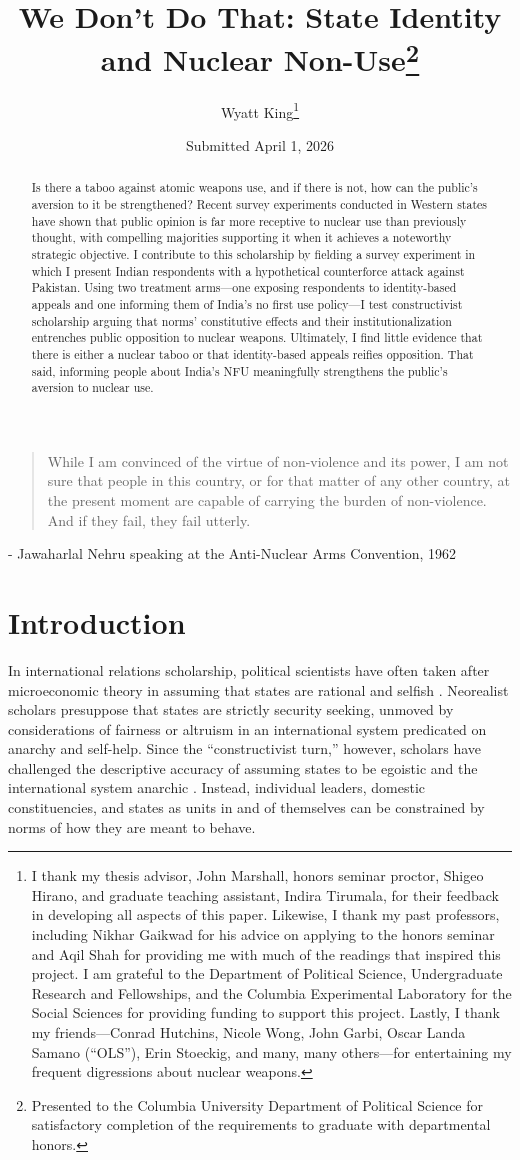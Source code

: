 \documentclass[12pt]{article}
\title{We Don't Do That: State Identity and Nuclear Non-Use\footnote{Presented to the Columbia University Department of Political Science for satisfactory completion of the requirements to graduate with departmental honors.}}
\author{Wyatt King\footnote{I thank my thesis advisor, John Marshall, honors seminar proctor, Shigeo Hirano, and graduate teaching assistant, Indira Tirumala, for their feedback in developing all aspects of this paper. Likewise, I thank my past professors, including Nikhar Gaikwad for his advice on applying to the honors seminar and Aqil Shah for providing me with much of the readings that inspired this project. I am grateful to the Department of Political Science, Undergraduate Research and Fellowships, and the Columbia Experimental Laboratory for the Social Sciences for providing funding to support this project. Lastly, I thank my friends—Conrad Hutchins, Nicole Wong, John Garbi, Oscar Landa Samano (“OLS”), Erin Stoeckig, and many, many others—for entertaining my frequent digressions about nuclear weapons.}}
\date{Submitted April 1, 2026}
\begin{document}
\maketitle
\begin{abstract} 
Is there a taboo against atomic weapons use, and if there is not, how can the public's aversion to it be strengthened? Recent survey experiments conducted in Western states have shown that public opinion is far more receptive to nuclear use than previously thought, with compelling majorities supporting it when it achieves a noteworthy strategic objective. I contribute to this scholarship by fielding a survey experiment in which I present Indian respondents with a hypothetical counterforce attack against Pakistan. Using two treatment arms—one exposing respondents to identity-based appeals and one informing them of India's no first use policy—I test constructivist scholarship arguing that norms' constitutive effects and their institutionalization entrenches public opposition to nuclear weapons. Ultimately, I find little evidence that there is either a nuclear taboo or that identity-based appeals reifies opposition. That said, informing people about India's NFU meaningfully strengthens the public's aversion to nuclear use.

\end{abstract}

\newpage
\doublespacing
\begin{center}
\blockquote{While I am convinced of the virtue of non-violence and its power, I am not sure that people in this country, or for that matter of any other country, at the present moment are capable of carrying the burden of non-violence. And if they fail, they fail utterly.}

- Jawaharlal Nehru speaking at the Anti-Nuclear Arms Convention, 1962
\end{center}

\section{Introduction}
In international relations scholarship, political scientists have often taken after microeconomic theory in assuming that states are rational and selfish \citep{waltz_theory_1979}. Neorealist scholars presuppose that states are strictly security seeking, unmoved by considerations of fairness or altruism in an international system predicated on anarchy and self-help. Since the “constructivist turn,” however, scholars have challenged the descriptive accuracy of assuming states to be egoistic and the international system anarchic \citep{wendt_anarchy_1992}. Instead, individual leaders, domestic constituencies, and states as units in and of themselves can be constrained by norms of how they are meant to behave. 
\end{document}
